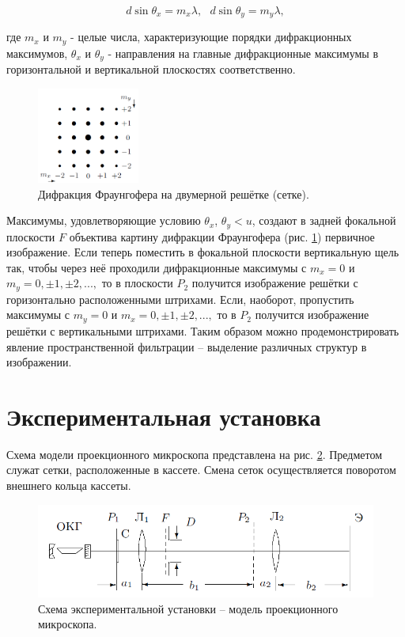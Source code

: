 \documentclass[a4paper, 12pt]{article}
\begin{document}
\begin{equation} \label{Главные максимумы}
d\sin\theta_x = m_x\lambda, ~~~ d\sin\theta_y = m_y\lambda,
\end{equation}

где $m_x$ и $m_y$ - целые числа, характеризующие порядки дифракционных максимумов, $\theta_x$ и $\theta_y$ - направления на главные дифракционные максимумы в горизонтальной и вертикальной плоскостях соответственно.

\begin{figure}[h]
\begin{center}
\includegraphics[width=0.3\textwidth]{Pic2.png}
\end{center}
\caption{Дифракция Фраунгофера на двумерной решётке (сетке).} \label{Дифракция}
\end{figure}

Максимумы, удовлетворяющие условию $\theta_x$, $\theta_y < u$, создают в задней фокальной плоскости $F$
объектива картину дифракции Фраунгофера (рис. \ref{Дифракция}) первичное изображение. Если теперь
поместить в фокальной плоскости вертикальную щель так, чтобы через неё проходили
дифракционные максимумы с $m_x = 0$ и $m_y = 0, \pm 1, \pm 2, ... ,$ то в плоскости $P_2$ получится
изображение решётки с горизонтально расположенными штрихами. Если, наоборот, пропустить
максимумы с $m_y = 0$ и $m_x = 0, \pm 1, \pm 2, ... ,$ то в $P_2$ получится изображение решётки с вертикальными
штрихами. Таким образом можно продемонстрировать явление пространственной фильтрации --
выделение различных структур в изображении.

\section*{Экспериментальная установка}

Схема модели проекционного микроскопа представлена на рис. \ref{Установка}. Предметом служат сетки, расположенные в кассете. Смена сеток осуществляется поворотом внешнего кольца кассеты.

\begin{figure}[h]
\begin{center}
\includegraphics[width=1\textwidth]{Pic3.png}
\end{center}
\caption{Схема экспериментальной установки -- модель проекционного микроскопа.} \label{Установка}
\end{figure}
\end{document}
